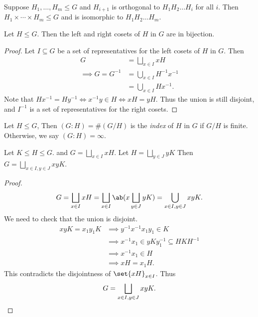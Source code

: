 \begin{remark}
    Suppose $H_1, \dots, H_m \le G$
    and $H_{i+1}$ is orthogonal to $H_1 H_2 \dots H_i$ for all $i$.
    Then $H_1 \times \cdots \times H_m \le G$
    and is isomorphic to $H_1 H_2 \dots H_m$.
\end{remark}

\begin{lemma} \label{thm:left-right}
    Let $H \le G$.
    Then the left and right cosets of $H$ in $G$ are in bijection.
\end{lemma}
\begin{proof}
    Let $I \subseteq G$ be a set of representatives for the left cosets of
    $H$ in $G$.
    Then \begin{align*}
        G &= \bigsqcup_{x \in I} x H \\
        \implies G = G^{-1} &= \bigcup_{x \in I} H^{-1} x^{-1} \\
        &= \bigcup_{x \in I} H x^{-1}.
    \end{align*}
    Note that $H x^{-1} = H y^{-1} \iff x^{-1} y \in H \iff xH = yH$.
    Thus the union is still disjoint, and $I^{-1}$ is a set of
    representatives for the right cosets.
\end{proof}
\begin{definition}[index] \label{def:index}
    Let $H \le G$,
    Then $(G : H) = \#(G / H)$ is the \emph{index} of $H$ in $G$
    if $G/H$ is finite.
    Otherwise, we say $(G : H) = \infty$.
\end{definition}

\begin{proposition}
    Let $K \le H \le G$.
    and $G = \bigsqcup_{x \in I} xH$.
    Let $H = \bigsqcup_{y \in J} yK$
    Then $G = \bigsqcup_{x \in I, y \in J} xyK$.
\end{proposition}
\begin{proof}
    \[
        G = \bigsqcup_{x \in I} xH
        = \bigsqcup_{x \in I} \ab(x \bigsqcup_{y \in J} yK)
        = \bigcup_{x \in I, y \in J} xyK.
    \] We need to check that the union is disjoint.
    \begin{align*}
        xyK = x_1y_1K &\implies y^{-1}x^{-1}x_1y_1 \in K \\
            &\implies x^{-1}x_1 \in yK y_1^{-1} \subseteq HKH^{-1} \\
            &\implies x^{-1}x_1 \in H \\
            &\implies xH = x_1H.
    \end{align*}
    This contradicts the disjointness of $\set{xH}_{x \in I}$.
    Thus \[
        G = \bigsqcup_{x \in I, y \in J} xyK. \qedhere
    \]
\end{proof}

